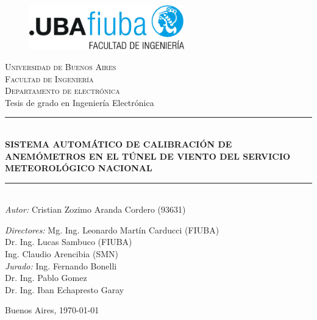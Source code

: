 \begin{titlepage}
\newcommand{\HRule}{\rule{\linewidth}{0.5mm}} 
\center 
\begin{figure}[H]
\centering
\includegraphics[width=0.6\textwidth]{fiuba_logo.jpg}
\end{figure}
\textsc{\large Universidad de Buenos Aires}\\[0.1cm] 
\textsc{\large Facultad de Ingeniería}\\[0.1cm]
\textsc{\large Departamento de electrónica}\\[1cm]

{\LARGE Tesis de grado en Ingeniería Electrónica} \\[0.1cm]

\HRule \\[0.1cm]
{\LARGE \bfseries SISTEMA AUTOMÁTICO DE CALIBRACIÓN DE ANEMÓMETROS EN EL TÚNEL DE VIENTO DEL SERVICIO METEOROLÓGICO NACIONAL}\\
\HRule \\[0.1cm]

\Large \emph{Autor:} \Large Cristian Zozimo Aranda Cordero (93631) \\[0.1cm]
\begin{flushleft}
\Large \emph{Directores:} \hspace{0.5em} \Large Mg. Ing. Leonardo Martín Carducci (FIUBA) \\[0.1cm]
\hspace{6em}\Large  Dr. Ing. Lucas Sambuco (FIUBA) \\
\hspace{6em}\Large  Ing. Claudio Arencibia (SMN)\\[0.5cm]
\Large \emph{Jurado:} \hspace{2em} \Large Ing. Fernando Bonelli\\
\hspace{6em}\Large Dr. Ing. Pablo Gomez  \\
\hspace{6em}\Large Dr. Ing. Iban Echapresto Garay \\[1cm] 
\end{flushleft}
\large  Buenos Aires, \today
\vfill 
\end{titlepage}
